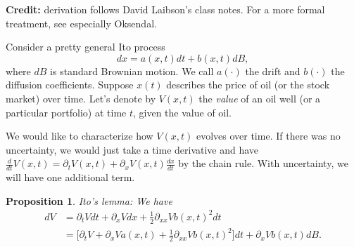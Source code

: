 \documentclass[11pt]{extarticle}
\theoremstyle{plain}
\newtheorem{prop}[thm]{Proposition}
\theoremstyle{definition}
\begin{document}
\textbf{Credit:} derivation follows David Laibson's class notes. For a more formal treatment, see especially Oksendal. 

\vspace{5mm}
\noindent
Consider a pretty general Ito process
\begin{equation*}
	dx = a(x, t) dt + b(x, t) dB,
\end{equation*}
where $dB$ is standard Brownian motion. We call $a(\cdot)$ the drift and $b(\cdot)$ the diffusion coefficients. Suppose $x(t)$ describes the price of oil (or the stock market) over time. Let's denote by $V(x, t)$ the \textit{value} of an oil well (or a particular portfolio) at time $t$, given the value of oil. 

We would like to characterize how $V(x, t)$ evolves over time. If there was no uncertainty, we would just take a time derivative and have $\frac{d}{dt} V(x, t) = \partial_t V(x, t) + \partial_x V(x, t) \frac{dx}{dt}$ by the chain rule. With uncertainty, we will have one additional term. 

\begin{prop}
	Ito's lemma: We have 
	\begin{align*}
		dV &= \partial_t V dt + \partial_x V dx + \frac{1}{2} \partial_{xx} V b(x, t)^2 dt \\
		&= \bigg[ \partial_t V + \partial_x V a(x, t) + \frac{1}{2} \partial_{xx} V b(x, t)^2\bigg] dt + \partial_x V b(x, t) dB.
	\end{align*}
\end{prop}
\end{document}
